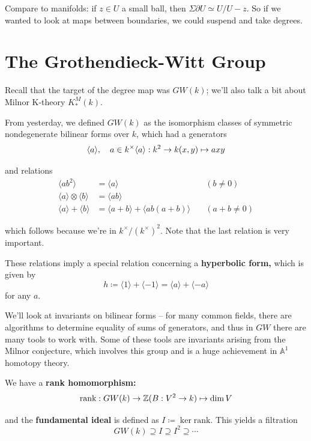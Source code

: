\documentclass[11pt]{scrreprt}
\theoremstyle{definition}
\newcommand{\ZZ}[0]{{\mathbb{Z}}}
\newcommand{\Af}[0]{{\mathbb{A}}}
\newcommand{\generators}[1]{\langle{#1}\rangle}
\newcommand{\tensor}[0]{\otimes}
\newcommand{\del}[0]{{\partial}}
\newcommand{\homotopic}[0]{\simeq}
\newcommand{\definedas}[0]{\coloneqq}
\begin{document}
Compare to manifolds: if \(z\in U\) a small ball, then
\(\Sigma \del U \homotopic U / U - z\). So if we wanted to look at maps
between boundaries, we could suspend and take degrees.

\hypertarget{the-grothendieck-witt-group-1}{%
\section{The Grothendieck-Witt
Group}\label{the-grothendieck-witt-group-1}}

Recall that the target of the degree map was \(GW(k)\); we'll also talk
a bit about Milnor K-theory \(K^M_*(k)\).

From yesterday, we defined \(GW(k)\) as the isomorphism classes of
symmetric nondegenerate bilinear forms over \(k\), which had a
generators \[
\generators{a}, \quad a\in k^\times\\
\generators{a}: k^2 \to k\\
(x,y) \mapsto axy
\]

and relations \begin{align*}
\generators{ab^2} &= \generators{a} \quad&(b\neq 0)\\
\generators{a}\tensor\generators{b} &= \generators{ab} &\\
\generators{a} + \generators b &= \generators{a+b} + \generators{ab(a+b)} \quad&(a+b\neq 0)
\end{align*}

which follows because we're in \(k^\times/(k^\times)^2\). Note that the
last relation is very important.

These relations imply a special relation concerning a \textbf{hyperbolic
form,} which is given by \[
h\definedas \generators {1} + \generators {-1} = \generators a + \generators{-a}
\] for any \(a\).

We'll look at invariants on bilinear forms -- for many common fields,
there are algorithms to determine equality of sums of generators, and
thus in \(GW\) there are many tools to work with. Some of these tools
are invariants arising from the Milnor conjecture, which involves this
group and is a huge achievement in \(\Af^1\) homotopy theory.

We have a \textbf{rank homomorphism:} \[
\text{rank}: GW(k) \to \ZZ \\
(B: V^2 \to k) \mapsto \dim V
\]

and the \textbf{fundamental ideal} is defined as
\(I \definedas \ker \text{rank}\). This yields a filtration \[
GW(k) \supseteq I \supseteq I^2 \supseteq \cdots
\]
\end{document}
